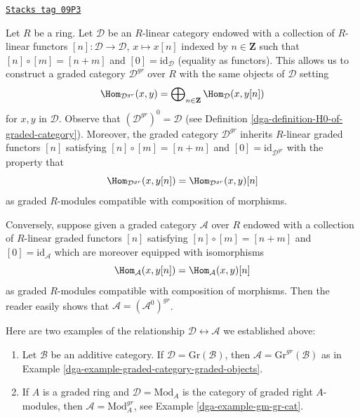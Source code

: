 \begin{remark}
\label{dga-remark-graded-shift-functors}
\href{https://stacks.math.columbia.edu/tag/09P3}{\texttt{Stacks tag 09P3}}

Let $R$ be a ring. Let $\mathcal{D}$ be an $R$-linear category endowed with a
collection of $R$-linear functors $[n] : \mathcal{D} \to \mathcal{D}$,
$x \mapsto x[n]$ indexed by $n \in \mathbf{Z}$ such that
$[n] \circ [m] = [n + m]$ and $[0] = \text{id}_\mathcal{D}$ (equality as
functors). This allows us to construct a graded category $\mathcal{D}^{gr}$
over $R$ with the same objects of $\mathcal{D}$ setting
$$
\Hom_{\mathcal{D}^{gr}}(x, y) =
\bigoplus\nolimits_{n \in \mathbf{Z}} \Hom_\mathcal{D}(x, y[n])
$$
for $x, y$ in $\mathcal{D}$. Observe that $(\mathcal{D}^{gr})^0 = \mathcal{D}$
(see Definition \ref{dga-definition-H0-of-graded-category}). Moreover, the graded
category $\mathcal{D}^{gr}$ inherits $R$-linear graded functors $[n]$
satisfying $[n] \circ [m] = [n + m]$ and $[0] = \text{id}_{\mathcal{D}^{gr}}$
with the property that
$$
\Hom_{\mathcal{D}^{gr}}(x, y[n]) = \Hom_{\mathcal{D}^{gr}}(x, y)[n]
$$
as graded $R$-modules compatible with composition of morphisms.

\medskip\noindent
Conversely, suppose given a graded category $\mathcal{A}$ over $R$ endowed
with a collection of $R$-linear graded functors $[n]$
satisfying $[n] \circ [m] = [n + m]$ and $[0] = \text{id}_\mathcal{A}$
which are moreover equipped with isomorphisms
$$
\Hom_\mathcal{A}(x, y[n]) = \Hom_\mathcal{A}(x, y)[n]
$$
as graded $R$-modules compatible with composition of morphisms. Then
the reader easily shows that $\mathcal{A} = (\mathcal{A}^0)^{gr}$.

\medskip\noindent
Here are two examples of the relationship
$\mathcal{D} \leftrightarrow \mathcal{A}$ we established above:
\begin{enumerate}
\item Let $\mathcal{B}$ be an additive category. If
$\mathcal{D} = \text{Gr}(\mathcal{B})$, then
$\mathcal{A} = \text{Gr}^{gr}(\mathcal{B})$ as in
Example \ref{dga-example-graded-category-graded-objects}.
\item If $A$ is a graded ring and $\mathcal{D} = \text{Mod}_A$
is the category of graded right $A$-modules, then
$\mathcal{A} = \text{Mod}^{gr}_A$, see Example \ref{dga-example-gm-gr-cat}.
\end{enumerate}
\end{remark}

